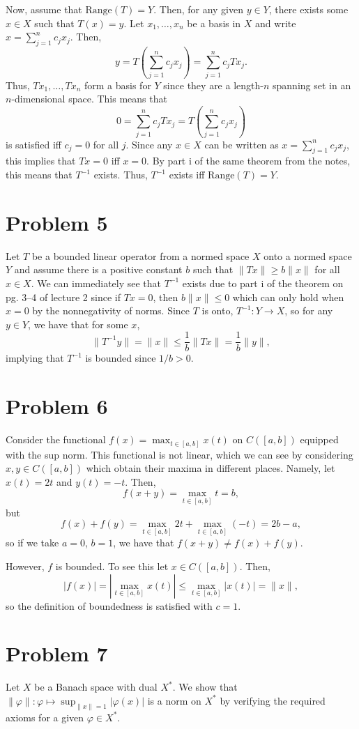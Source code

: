 \documentclass{article}
\begin{document}
Now, assume that $\text{Range}(T)=Y$. Then, for any given $y\in Y$, there exists some $x\in X$ such that $T(x)=y$. Let $x_1,\ldots,x_n$ be a basis in $X$ and write $x=\sum_{j=1}^{n}c_jx_j$. Then,
\[
y=T\left(\sum_{j=1}^{n}c_jx_j\right)=\sum_{j=1}^{n}c_jTx_j.
\]
Thus, $Tx_1,\ldots,Tx_n$ form a basis for $Y$ since they are a length-$n$ spanning set in an $n$-dimensional space. This means that 
\[
0=\sum_{j=1}^{n}c_jTx_j=T\left(\sum_{j=1}^{n}c_jx_j\right)
\]
is satisfied iff $c_j=0$ for all $j$. Since any $x\in X$ can be written as $x=\sum_{j=1}^{n}c_jx_j$, this implies that $Tx=0$ iff $x=0$. By part i of the same theorem from the notes, this means that $T^{-1}$ exists. Thus, $T^{-1}$ exists iff $\text{Range}(T)=Y$.

\section{Problem 5}
Let $T$ be a bounded linear operator from a normed space $X$ onto a normed space $Y$ and  assume there is a positive constant $b$ such that $\|Tx\|\geq b\|x\|$ for all $x\in X$. We can immediately see that $T^{-1}$ exists due to part i of the theorem on pg. 3--4 of lecture 2 since if $Tx=0$, then $b\|x\|\leq0$ which can only hold when $x=0$ by the nonnegativity of norms. Since $T$ is onto, $T^{-1}:Y\to X$, so for any $y\in Y$, we have that for some $x$,
\[
\|T^{-1}y\|=\|x\|\leq\frac{1}{b}\|Tx\|=\frac{1}{b}\|y\|,
\]
implying that $T^{-1}$ is bounded since $1/b>0$.

\section{Problem 6}
Consider the functional $f(x)=\max_{t \in [a,b]} x(t)$ on $C([a,b])$ equipped with the sup norm. This functional is not linear, which we can see by considering $x,y\in C([a,b])$ which obtain their maxima in different places. Namely, let $x(t)=2t$ and $y(t)=-t$. Then,
\[
f(x+y)=\max_{t \in [a,b]}t=b,
\]
but 
\[
f(x)+f(y)=\max_{t \in [a,b]}2t+\max_{t \in [a,b]}(-t)=2b-a,
\]
so if we take $a=0$, $b=1$, we have that $f(x+y)\neq f(x)+f(y)$. 

However, $f$ is bounded. To see this let $x\in C([a,b])$. Then,
\[
|f(x)|=\left|\max_{t \in [a,b]} x(t)\right|\leq\max_{t \in [a,b]} |x(t)|=\|x\|,
\]
so the definition of boundedness is satisfied with $c=1$.

\section{Problem 7}
Let $X$ be a Banach space with dual $X^*$. We show that $\|\varphi\| : \varphi \mapsto \sup_{\|x\|=1} |\varphi(x)|$ is a norm on $X^*$ by verifying the required axioms for a given $\varphi\in X^*$.
\end{document}
